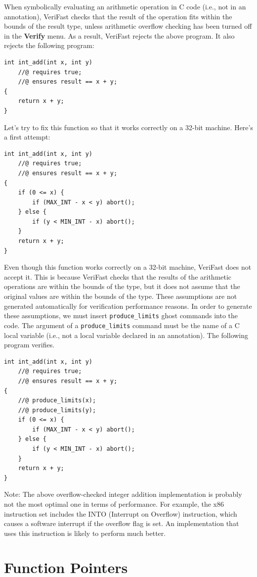 \documentclass{article}
\begin{document}
When symbolically evaluating an arithmetic operation in C code
(i.e., not in an annotation), VeriFast checks that the result
of the operation fits within the bounds of the result type,
unless arithmetic overflow checking has been turned off in the
\textbf{Verify} menu. As a result, VeriFast rejects the above
program. It also rejects the following program:
\begin{lstlisting}
int int_add(int x, int y)
    //@ requires true;
    //@ ensures result == x + y;
{
    return x + y;
}
\end{lstlisting}
Let's try to fix this function so that it works correctly on a
32-bit machine. Here's a first attempt:
\begin{lstlisting}
int int_add(int x, int y)
    //@ requires true;
    //@ ensures result == x + y;
{
    if (0 <= x) {
        if (MAX_INT - x < y) abort();
    } else {
        if (y < MIN_INT - x) abort();
    }
    return x + y;
}
\end{lstlisting}
Even though this function works correctly on a 32-bit machine,
VeriFast does not accept it. This is because VeriFast checks
that the results of the arithmetic operations are within the
bounds of the type, but it does not assume that the original
values are within the bounds of the type. These assumptions are
not generated automatically for verification performance
reasons. In order to generate these assumptions, we must insert
\lstinline!produce_limits! ghost commands into the code. The
argument of a \lstinline!produce_limits! command must be the
name of a C local variable (i.e., not a local variable declared
in an annotation). The following program verifies.
\begin{lstlisting}
int int_add(int x, int y)
    //@ requires true;
    //@ ensures result == x + y;
{
    //@ produce_limits(x);
    //@ produce_limits(y);
    if (0 <= x) {
        if (MAX_INT - x < y) abort();
    } else {
        if (y < MIN_INT - x) abort();
    }
    return x + y;
}
\end{lstlisting}

Note: The above overflow-checked integer addition
implementation is probably not the most optimal one in terms of
performance. For example, the x86 instruction set includes the
INTO (Interrupt on Overflow) instruction, which causes a
software interrupt if the overflow flag is set. An
implementation that uses this instruction is likely to perform
much better.

\section{Function Pointers}\label{section:function-pointers}
\end{document}
